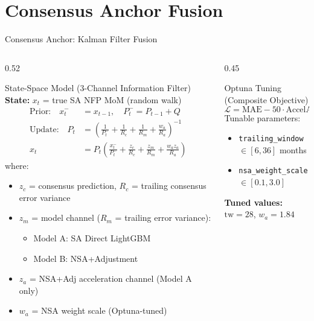 \documentclass[aspectratio=169,10pt]{beamer}
\begin{document}
\section{Consensus Anchor Fusion}

\begin{frame}{Consensus Anchor: Kalman Filter Fusion}
\begin{columns}[T]
\begin{column}{0.52\textwidth}
\begin{block}{State-Space Model (3-Channel Information Filter)}
\footnotesize
\textbf{State:} $x_t$ = true SA NFP MoM (random walk)
\begin{align*}
\text{Prior:} \quad x_t^- &= x_{t-1}, \quad P_t^- = P_{t-1} + Q \\
\text{Update:} \quad P_t &= \left(\frac{1}{P_t^-} + \frac{1}{R_c} + \frac{1}{R_m} + \frac{w_a}{R_a}\right)^{-1} \\
x_t &= P_t \left(\frac{x_t^-}{P_t^-} + \frac{z_c}{R_c} + \frac{z_m}{R_m} + \frac{w_a z_a}{R_a}\right)
\end{align*}
where:
\begin{itemize}\scriptsize
  \item $z_c$ = consensus prediction, $R_c$ = trailing consensus error variance
  \item $z_m$ = model channel ($R_m$ = trailing error variance):
    \begin{itemize}\tiny
      \item Model A: SA Direct LightGBM
      \item Model B: NSA+Adjustment
    \end{itemize}
  \item $z_a$ = NSA+Adj acceleration channel (Model A only)
  \item $w_a$ = NSA weight scale (Optuna-tuned)
\end{itemize}
\end{block}
\end{column}
\begin{column}{0.45\textwidth}
\begin{block}{Optuna Tuning (Composite Objective)}
\footnotesize
\[
\mathcal{L} = \text{MAE} - 50 \cdot \text{AccelAcc} - 30 \cdot \text{DirAcc}
\]
Tunable parameters:
\begin{itemize}\scriptsize
  \item \texttt{trailing\_window} $\in [6, 36]$ months
  \item \texttt{nsa\_weight\_scale} $\in [0.1, 3.0]$
\end{itemize}
\textbf{Tuned values:} $\text{tw}=28$, $w_a=1.84$
\end{block}


\end{column}
\end{columns}
\end{frame}
\end{document}
